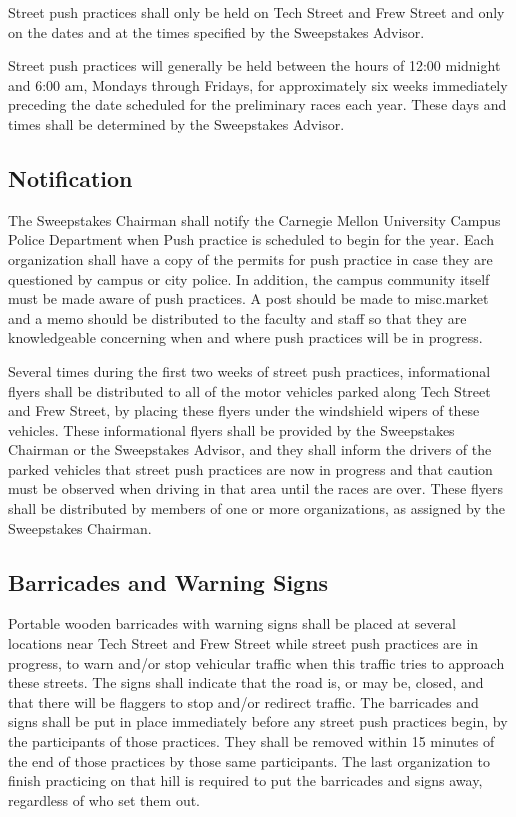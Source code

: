 	Street push practices shall only be held on Tech Street and Frew Street and
	only on the dates and at the times specified by the Sweepstakes Advisor.

	Street push practices will generally be held between the hours of 12:00
	midnight and 6:00 am, Mondays through Fridays, for approximately six weeks
	immediately preceding the date scheduled for the preliminary races each year.
	These days and times shall be determined by the Sweepstakes Advisor.

\subsection{Notification}

	The Sweepstakes Chairman shall notify the Carnegie Mellon University Campus
	Police Department when Push practice is scheduled to begin for the year. Each
	organization shall have a copy of the permits for push practice in case they
	are questioned by campus or city police. In addition, the campus community 
	itself must be made aware of push practices. A post should be made to 
	misc.market and a memo should be distributed to the faculty and staff so that 
	they are knowledgeable concerning when and where push practices will be in 
	progress.

	
	Several times during the first two weeks of street push practices,
	informational flyers shall be distributed to all of the motor vehicles parked
	along Tech Street and Frew Street, by placing these flyers under the windshield
	wipers of these vehicles. These informational flyers shall be provided by the
	Sweepstakes Chairman or the Sweepstakes Advisor, and they shall inform the
	drivers of the parked vehicles that street push practices are now in progress
	and that caution must be observed when driving in that area until the races are
	over. These flyers shall be distributed by members of one or more
	organizations, as assigned by the Sweepstakes Chairman.

\subsection{Barricades and Warning Signs}

	Portable wooden barricades with warning signs shall be placed at several
	locations near Tech Street and Frew Street while street push practices are in
	progress, to warn and/or stop vehicular traffic when this traffic tries to
	approach these streets. The signs shall indicate that the road is, or may be,
	closed, and that there will be flaggers to stop and/or redirect traffic. The
	barricades and signs shall be put in place immediately before any street push
	practices begin, by the participants of those practices. They shall be removed
	within 15 minutes of the end of those practices by those same participants.
	The last organization to finish practicing on that hill is required to put
	the barricades and signs away, regardless of who set them out.

